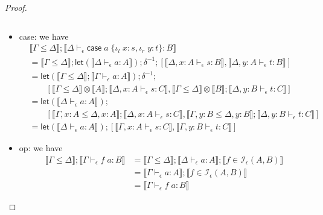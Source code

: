 \documentclass[acmsmall,screen,review]{acmart}
\newcommand{\mc}[1]{\ensuremath{\mathcal{#1}}}
\newcommand{\ms}[1]{\ensuremath{\mathsf{#1}}}
\newcommand{\lto}{:}
\newcommand{\linl}[1]{\iota_l\;{#1}}
\newcommand{\linr}[1]{\iota_r\;{#1}}
\newcommand{\caseexpr}[5]{\ms{case}\;#1\;\{\linl{#2} \lto #3, \linr{#4} \lto #5\}}
\newcommand{\bhyp}[2]{#1 : #2}
\newcommand{\hasty}[4]{#1 \vdash_{#2} #3: {#4}}
\newcommand{\isop}[4]{#1 \in \mc{I}_{#4}(#2, #3)}
\newcommand{\brle}[1]{{\textsf{#1}}}
\newcommand{\dnt}[1]{\llbracket{#1}\rrbracket}
\newcommand{\lmor}[1]{\ms{let}(#1)}
\begin{document}
\begin{proof}
\begin{itemize}
\begin{equation}
    \end{equation}
    \item \brle{case}: we have
    \begin{equation}
      \begin{aligned}
        & \dnt{\Gamma \leq \Delta} ; \dnt{\hasty{\Delta}{\epsilon}{\caseexpr{a}{x}{s}{y}{t}}{B}} \\
        & = \dnt{\Gamma \leq \Delta} 
          ; \lmor{\dnt{\hasty{\Delta}{\epsilon}{a}{A}}}
          ; \delta^{-1}
          ; [\dnt{\hasty{\Delta, \bhyp{x}{A}}{\epsilon}{s}{B}}, 
             \dnt{\hasty{\Delta, \bhyp{y}{A}}{\epsilon}{t}{B}}] \\
        & = \lmor{\dnt{\Gamma \leq \Delta} ; \dnt{\hasty{\Gamma}{\epsilon}{a}{A}}}
          ; \delta^{-1}
          ; \\ & \qquad [
              \dnt{\Gamma \leq \Delta} \otimes \dnt{A} 
                ; \dnt{\hasty{\Delta, \bhyp{x}{A}}{\epsilon}{s}{C}},
              \dnt{\Gamma \leq \Delta} \otimes \dnt{B} 
                ; \dnt{\hasty{\Delta, \bhyp{y}{B}}{\epsilon}{t}{C}}
             ] \\
        & = \lmor{\dnt{\hasty{\Delta}{\epsilon}{a}{A}}}
          ; \\ & \qquad [
            \dnt{\Gamma, \bhyp{x}{A} \leq \Delta, \bhyp{x}{A}} 
              ; \dnt{\hasty{\Delta, \bhyp{x}{A}}{\epsilon}{s}{C}},
            \dnt{\Gamma, \bhyp{y}{B} \leq \Delta, \bhyp{y}{B}}
              ; \dnt{\hasty{\Delta, \bhyp{y}{B}}{\epsilon}{t}{C}}
           ] \\
        & = \lmor{\dnt{\hasty{\Delta}{\epsilon}{a}{A}}}
          ; [
            \dnt{\hasty{\Gamma, \bhyp{x}{A}}{\epsilon}{s}{C}},
            \dnt{\hasty{\Gamma, \bhyp{y}{B}}{\epsilon}{t}{C}}
           ]
      \end{aligned}
    \end{equation}
    \item \brle{op}: we have
    \begin{equation}
      \begin{aligned}
        \dnt{\Gamma \leq \Delta} ; \dnt{\hasty{\Gamma}{\epsilon}{f\;a}{B}} 
        & = \dnt{\Gamma \leq \Delta} 
          ; \dnt{\hasty{\Delta}{\epsilon}{a}{A}} 
          ; \dnt{\isop{f}{A}{B}{\epsilon}} \\
        & = \dnt{\hasty{\Gamma}{\epsilon}{a}{A}} 
          ; \dnt{\isop{f}{A}{B}{\epsilon}} \\
        & = \dnt{\hasty{\Gamma}{\epsilon}{f\;a}{B}}
      \end{aligned}

\end{equation}
\end{itemize}
\end{proof}
\end{document}
